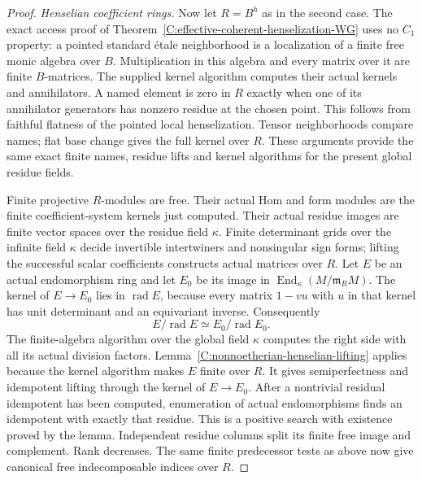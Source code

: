 \begin{proof}
\emph{Henselian coefficient rings.}
Now let $R=B^h$ as in the
second case.
The exact access proof of
Theorem~\ref{C:effective-coherent-henselization-WG}
uses no $C_1$ property:
a pointed standard \'{e}tale
neighborhood is a localization
of a finite free monic algebra
over $B$.
Multiplication in this algebra
and every matrix over it are
finite $B$-matrices.
The supplied kernel algorithm
computes their actual kernels
and annihilators.
A named element is zero in
$R$ exactly when one of its
annihilator generators has
nonzero residue at the chosen
point.
This follows from faithful
flatness of the pointed
local henselization.
Tensor neighborhoods compare
names; flat base change gives
the full kernel over $R$.
These arguments provide the
same exact finite names,
residue lifts and kernel
algorithms for the present
global residue fields.

Finite projective $R$-modules
are free.
Their actual Hom and form
modules are the finite
coefficient-system kernels
just computed.
Their actual residue images
are finite vector spaces over
the residue field $\kappa$.
Finite determinant grids over
the infinite field $\kappa$
decide invertible intertwiners
and nonsingular sign forms;
lifting the successful scalar
coefficients constructs actual
matrices over $R$.
Let $E$ be an actual
endomorphism ring and let
$E_0$ be its image in
$\operatorname{End}_\kappa(M/\mathfrak m_RM)$.
The kernel of $E\to E_0$
lies in $\operatorname{rad}E$,
because every matrix $1-vu$
with $u$ in that kernel
has unit determinant and
an equivariant inverse.
Consequently
\[
       E/\operatorname{rad}E
                  \simeq E_0/\operatorname{rad}E_0 .
                                                               \tag{C.3.GW2}
\]
The finite-algebra algorithm
over the global field $\kappa$
computes the right side with
all its actual division factors.
Lemma~\ref{C:nonnoetherian-henselian-lifting}
applies because the kernel
algorithm makes $E$ finite
over $R$.
It gives semiperfectness
and idempotent lifting through
the kernel of $E\to E_0$.
After a nontrivial residual
idempotent has been computed,
enumeration of actual endomorphisms
finds an idempotent with exactly
that residue.
This is a positive search with
existence proved by the lemma.
Independent residue columns
split its finite free image
and complement.
Rank decreases.
The same finite predecessor
tests as above now give
canonical free indecomposable
indices over $R$.


\end{proof}
